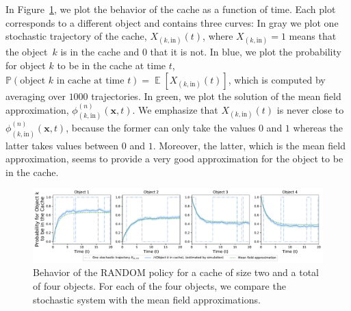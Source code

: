 \documentclass[acmsmall]{acmart}
\newcommand\bx{\mathbf{x}}
\newcommand\toN{^{(n)}}
\DeclareMathOperator{\E}{\mathbb{E}} %
\newcommand\Proba[1]{\mathbb{P}\left(#1\right)} %
\newcommand\esp[1]{\E\left[#1\right]} %
\begin{document}
In Figure~\ref{fig:cache_illustration}, we plot the behavior of the cache as a function of time. Each plot corresponds to a different object and contains three curves: In gray we plot one stochastic trajectory of the cache, $X_{(k,\text{in})}(t)$, where $X_{(k,\text{in})}=1$ means that the object~$k$ is in the cache and $0$ that it is not. In blue, we plot the probability for object $k$ to be in the cache at time $t$, $\Proba{\text{object $k$ in cache at time $t$}} = \esp{X_{(k,\text{in})}(t)}$, which is computed by averaging over $1000$ trajectories.  In green, we plot the solution of the mean field approximation, $\phi\toN_{(k,\text{in})}(\bx,t)$. We emphasize that $X_{(k,\text{in})}(t)$ is never close to $\phi\toN_{(k,\text{in})}(\bx,t)$, because the former can only take the values $0$ and $1$ whereas the latter takes values between $0$ and $1$. Moreover, the latter, which is the mean field approximation, seems to provide a very good approximation for the object to be in the cache. 
\begin{figure}[ht]
  \centering
  \includegraphics[width=\linewidth]{probability_cache_single}
  \caption{Behavior of the RANDOM policy for a cache of size two and a total of four objects. For each of the four objects, we compare the stochastic system with the mean field approximations.}
  \label{fig:cache_illustration}
\end{figure}

\end{document}
